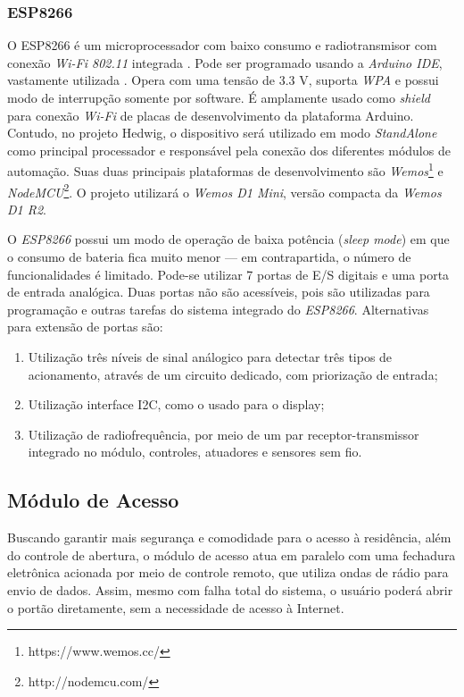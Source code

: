 \subsubsection{ESP8266 \label{subsec:esp8266}}
O ESP8266 é um microprocessador com baixo consumo e radiotransmisor com conexão \emph{Wi-Fi 802.11} integrada \cite{espressif}. Pode ser programado usando a \emph{Arduino IDE}, vastamente utilizada \cite{thomsen}. Opera com uma tensão de 3.3 V, suporta \emph{WPA} e possui modo de interrupção somente por software. É amplamente usado como \textit{shield} para conexão \emph{Wi-Fi} de placas de desenvolvimento da plataforma Arduino. Contudo, no projeto Hedwig, o dispositivo será utilizado em modo \textit{StandAlone} como principal processador e responsável pela conexão dos diferentes módulos de automação. Suas duas principais plataformas de desenvolvimento são \emph{Wemos}\footnote{https://www.wemos.cc/} e \emph{NodeMCU}\footnote{http://nodemcu.com/}. O projeto utilizará o \emph{Wemos D1 Mini}, versão compacta da \emph{Wemos D1 R2}.

O \emph{ESP8266} possui um modo de operação de baixa potência (\textit{sleep mode}) em que o consumo de bateria fica muito menor --- em contrapartida, o número de funcionalidades é limitado. Pode-se utilizar 7 portas de E\slash{}S digitais e uma porta de entrada analógica. Duas portas não são acessíveis, pois são utilizadas para programação e outras tarefas do sistema integrado do \emph{ESP8266}. Alternativas para extensão de portas são:

\begin{enumerate}
	\item Utilização três níveis de sinal análogico para detectar três tipos de acionamento, através de um circuito dedicado, com priorização de entrada;

	\item Utilização interface I2C, como o usado para o display;

	\item Utilização de radiofrequência, por meio de um par receptor-transmissor integrado no módulo, controles, atuadores e sensores sem fio.
\end{enumerate}

\subsection{Módulo de Acesso}

Buscando garantir mais segurança e comodidade para o acesso à residência, além do controle de abertura, o módulo de acesso atua em paralelo com uma fechadura eletrônica acionada por meio de controle remoto, que utiliza ondas de rádio para envio de dados. Assim, mesmo com falha total do sistema, o usuário poderá abrir o portão diretamente, sem a necessidade de acesso à Internet.

